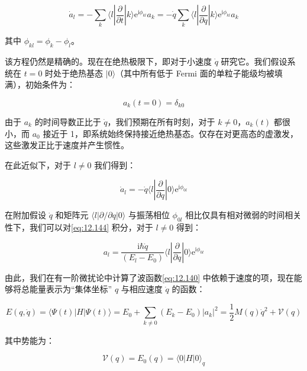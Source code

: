 \begin{equation}
\dot{a}_{l}=-\sum_{k}\langle l|\frac{\partial}{\partial t}|k\rangle\mathrm{e}^{\mathrm{i}\phi_{kl}}a_{k}=-\dot{q}\sum_{k}\langle l|\frac{\partial}{\partial q}|k\rangle\mathrm{e}^{\mathrm{i}\phi_{kl}}a_{k}\label{eq:12.142}
\end{equation}

其中 $\phi_{kl}=\phi_{k}-\phi_{l}$。

该方程仍然是精确的。现在在绝热极限下，即对于小速度 $\dot{q}$ 研究它。我们假设系统在 $t=0$ 时处于绝热基态 $|0\rangle$（其中所有低于
Fermi 面的单粒子能级均被填满），初始条件为：

\begin{equation}
a_{k}(t=0)=\delta_{k0}\label{eq:12.143}
\end{equation}

由于 $a_{k}$ 的时间导数正比于 $\dot{q}$，我们预期在所有时刻，对于 $k\neq0$，$a_{k}(t)$
都很小，而 $a_{0}$ 接近于 1，即系统始终保持接近绝热基态。仅存在对更高态的虚激发，这些激发正比于速度并产生惯性。

在此近似下，对于 $l\neq0$ 我们得到：

\begin{equation}
\dot{a}_{l}=-\dot{q}\langle l|\frac{\partial}{\partial q}|0\rangle\mathrm{e}^{\mathrm{i}\phi_{0l}}\label{eq:12.144}
\end{equation}

在附加假设 $\dot{q}$ 和矩阵元 $\langle l|\partial/\partial q|0\rangle$ 与振荡相位
$\phi_{0l}$ 相比仅具有相对微弱的时间相关性下，我们可以对\ref{eq:12.144} 积分，对于 $l\neq0$
得到：

\begin{equation}
a_{l}=\frac{\mathrm{i}\hbar\dot{q}}{(E_{l}-E_{0})}\langle l|\frac{\partial}{\partial q}|0\rangle\mathrm{e}^{\mathrm{i}\phi_{0l}}\label{eq:12.145}
\end{equation}

由此，我们在有一阶微扰论中计算了波函数\ref{eq:12.140} 中依赖于速度的项，现在能够将总能量表示为“集体坐标” $q$
与相应速度 $\dot{q}$ 的函数：

\begin{equation}
E(q,\dot{q})=\langle\Psi(t)|H|\Psi(t)\rangle=E_{0}+\sum_{k\neq0}(E_{k}-E_{0})|a_{k}|^{2}=\frac{1}{2}M(q)\dot{q}^{2}+\mathcal{V}(q)\label{eq:12.146}
\end{equation}

其中势能为：

\begin{equation}
\mathcal{V}(q)=E_{0}(q)=\langle0|H|0\rangle_{q}\label{eq:12.146b}
\end{equation}

